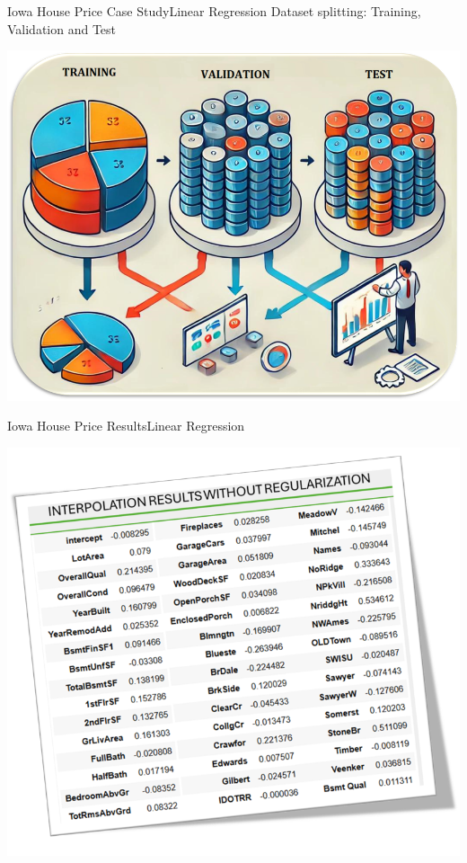 \documentclass[11pt]{beamer}
\begin{document}
\begin{frame}{Iowa House Price Case Study}{Linear Regression}
	Dataset splitting: Training, Validation and Test
	\begin{center}
	\includegraphics[scale=.3]{../05-pictures/lesson-3-1_pic_2.png}
	\end{center}
\end{frame}
\begin{frame}{Iowa House Price Results}{Linear Regression}
	\begin{center}
	\includegraphics[scale=.4]{../05-pictures/lesson-3-1_pic_3.png}
	\end{center}
\end{frame}
\end{document}
